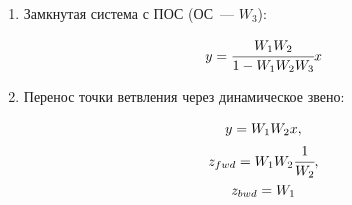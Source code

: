 \begin{enumerate}
    \item Замкнутая система с ПОС (ОС~--- $W_3$):
    \begin{figure}[h!]
        \begin{minipage}[h]{0.5\linewidth}
        \end{minipage}
        \begin{minipage}[h]{0.5\linewidth}
            \begin{equation}
                y = \cfrac{W_1 W_2}{1 - W_1 W_2 W_3} x
            \end{equation}
        \end{minipage}
    \end{figure}
    
    \item Перенос точки ветвления через динамическое звено:
    \begin{figure}[h!]
        \begin{minipage}[h]{0.5\linewidth}
        \end{minipage}
        \begin{minipage}[h]{0.5\linewidth}
            \begin{gather}
                y = W_1 W_2 x, \\
                z_{fwd} = W_1 W_2 \cfrac{1}{W_2}, \\
                z_{bwd} = W_1
            \end{gather}
        \end{minipage}
    \end{figure}
    

\end{enumerate}

